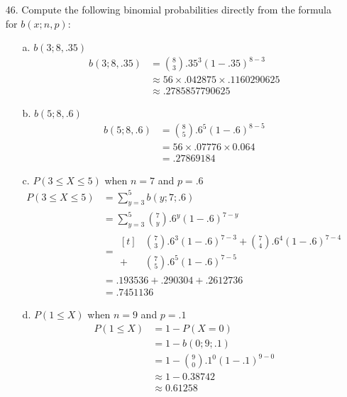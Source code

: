 \documentclass[letterpaper,12pt]{article}
\newcommand{\bp}[3]{%
  \binom{#2}{#1}#3^#1(1 - #3)^{#2 - #1}%
}
\begin{document}
\maketitle

\begin{enumerate}
  \item[46.]
    Compute the following binomial probabilities directly from the formula for $b(x; n, p)$:
    \begin{enumerate}
      \item[a.]
        $b(3; 8, .35)$
        \begin{align*}
          b(3; 8, .35) &= \bp{3}{8}{.35} \\
          &\approx 56 \times .042875 \times .1160290625 \\
          &\approx .2785857790625
        \end{align*}
      \item[b.]
        $b(5; 8, .6)$
        \begin{align*}
          b(5; 8, .6) &= \bp{5}{8}{.6}  \\
          &= 56 \times .07776 \times 0.064 \\
          &= .27869184
        \end{align*}
      \item[c.]
        $P(3 \le X \le 5)$ when $n = 7$ and $p = .6$
        \begin{align*}
          P(3 \le X \le 5) &= \sum_{y = 3}^5 b(y; 7; .6) \\
          &= \sum_{y = 3}^5 \bp{y}{7}{.6}  \\
          &= \begin{aligned}[t]
              &\bp{3}{7}{.6} + \bp{4}{7}{.6}  \\
            + &\bp{5}{7}{.6}
          \end{aligned} \\
          &= .193536 + .290304 + .2612736 \\
          &= .7451136
        \end{align*}
      \item[d.]
        $P(1 \le X)$ when $n = 9$ and $p = .1$
        \begin{align*}
          P(1 \le X) &= 1 - P(X = 0) \\
          &= 1 - b(0; 9; .1) \\
          &= 1 - \bp{0}{9}{.1} \\
          &\approx 1 - 0.38742 \\
          &\approx 0.61258

\end{align*}
\end{enumerate}
\end{enumerate}
\end{document}
